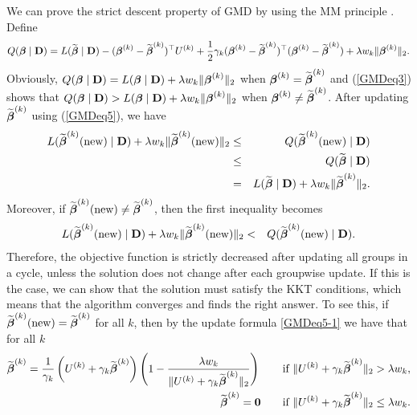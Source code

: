We can prove the strict descent property of GMD by using the MM principle \citep{MM1,hunter2004tutorial,MM08}. Define
\begin{equation}
Q(\boldsymbol{\beta} \mid \textbf{D})=L(\widetilde {\boldsymbol{\beta}} \mid \textbf{D})-(\boldsymbol{\beta}^{(k)}-\widetilde {\boldsymbol{\beta}}^{(k)})^{\top}
U^{(k)}+\frac{1}{2} \gamma_k (\boldsymbol{\beta}^{(k)}-\widetilde {\boldsymbol{\beta}}^{(k)})^{\top} ( \boldsymbol{\beta}^{(k)}- \widetilde {\boldsymbol{\beta}}^{(k)})+\lambda w_k \Vert \boldsymbol{\beta}^{(k)}\Vert_2.
\end{equation}
Obviously, $Q(\boldsymbol{\beta} \mid \textbf{D})=L(\boldsymbol{\beta} \mid \textbf{D})+\lambda w_k \Vert \boldsymbol{\beta}^{(k)}\Vert_2$ when $\boldsymbol{\beta}^{(k)}=\widetilde {\boldsymbol{\beta}}^{(k)}$ and
(\ref{GMDeq3}) shows that
$Q(\boldsymbol{\beta} \mid \textbf{D}) > L(\boldsymbol{\beta} \mid \textbf{D})+\lambda w_k \Vert \boldsymbol{\beta}^{(k)}\Vert_2$ when $\boldsymbol{\beta}^{(k)} \neq \widetilde {\boldsymbol{\beta}}^{(k)}$.
After updating $\widetilde {\boldsymbol{\beta}}^{(k)}$ using (\ref{GMDeq5}), we have
\begin{eqnarray*}
	L(\widetilde {\boldsymbol{\beta}}^{(k)}(\textrm{new}) \mid \textbf{D})+\lambda w_k \Vert \widetilde {\boldsymbol{\beta}}^{(k)}(\textrm{new}) \Vert_2
	&  \le &  Q(\widetilde {\boldsymbol{\beta}}^{(k)}(\textrm{new})  \mid \textbf{D})\\
	& \le & Q(\widetilde {\boldsymbol{\beta}}  \mid \textbf{D}) \\
	& = & L(\widetilde {\boldsymbol{\beta}} \mid \textbf{D})+\lambda w_k \Vert \widetilde {\boldsymbol{\beta}}^{(k)}\Vert_2.
\end{eqnarray*}
Moreover, if $\widetilde {\boldsymbol{\beta}}^{(k)}(\textrm{new}) \neq \widetilde {\boldsymbol{\beta}}^{(k)}$, then the first inequality becomes
\begin{eqnarray*}
	L(\widetilde {\boldsymbol{\beta}}^{(k)}(\textrm{new}) \mid \textbf{D})+\lambda w_k \Vert \widetilde {\boldsymbol{\beta}}^{(k)}(\textrm{new}) \Vert_2
	&  < &  Q(\widetilde {\boldsymbol{\beta}}^{(k)}(\textrm{new})  \mid \textbf{D}).
\end{eqnarray*}
Therefore, the objective function is strictly decreased after updating all groups in a cycle, unless the solution does not change after each groupwise update. If this is the case,
we can show that the solution must satisfy the KKT conditions, which means that the algorithm converges and finds the right answer. To see this,
if $\widetilde {\boldsymbol{\beta}}^{(k)}(\textrm{new}) = \widetilde {\boldsymbol{\beta}}^{(k)}$ for all $k$, then by the update formula \eqref{GMDeq5-1} we have that for all $k$
\begin{align}\label{KKTcond1}
\widetilde {\boldsymbol{\beta}}^{(k)} = \frac{1}{\gamma_k}\left( U^{(k)}+\gamma_k \widetilde {\boldsymbol{\beta}}^{(k)} \right)\left(1-\frac{\lambda w_k}{\Vert U^{(k)}+\gamma_k \widetilde {\boldsymbol{\beta}}^{(k)} \Vert_2}\right) \qquad\textrm{if }\Vert U^{(k)}+\gamma_k \widetilde {\boldsymbol{\beta}}^{(k)} \Vert_2 > \lambda w_{k},\\\label{KKTcond2}
\widetilde {\boldsymbol{\beta}}^{(k)} = \boldsymbol{0} \qquad\textrm{if }\Vert U^{(k)}+\gamma_k \widetilde {\boldsymbol{\beta}}^{(k)} \Vert_2 \leq \lambda w_{k}.
\end{align}
